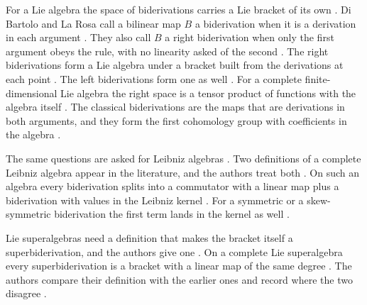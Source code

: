 For a Lie algebra the space of biderivations carries a Lie bracket of its own
\cite[p.~1]{DiBartoloLaRosa2026}. Di Bartolo and La Rosa call a bilinear map
$B$ a biderivation when it is a derivation in each argument
\cite[Definition~2.1, p.~2]{DiBartoloLaRosa2026}. They also call $B$ a right
biderivation when only the first argument obeys the rule, with no linearity
asked of the second \cite[Definition~3.1, p.~3]{DiBartoloLaRosa2026}. The
right biderivations form a Lie algebra under a bracket built from the
derivations at each point \cite[Theorem~3.5, p.~4]{DiBartoloLaRosa2026}. The
left biderivations form one as well \cite[Theorem~3.6,
p.~4]{DiBartoloLaRosa2026}. For a complete finite-dimensional Lie algebra the
right space is a tensor product of functions with the algebra itself
\cite[Corollary~3.8, p.~5]{DiBartoloLaRosa2026}. The classical biderivations
are the maps that are derivations in both arguments, and they form the first
cohomology group with coefficients in the algebra
\cite[p.~1]{DiBartoloLaRosa2026}.

The same questions are asked for Leibniz algebras
\cite[p.~1]{DiBartoloDiFattaLaRosa2025Leibniz}. Two definitions of a complete
Leibniz algebra appear in the literature, and the authors treat both
\cite[Definitions~2.6 and~2.7, p.~6]{DiBartoloDiFattaLaRosa2025Leibniz}. On
such an algebra every biderivation splits into a commutator with a linear map
plus a biderivation with values in the Leibniz kernel \cite[Theorem~3.1,
p.~7]{DiBartoloDiFattaLaRosa2025Leibniz}. For a symmetric or a skew-symmetric
biderivation the first term lands in the kernel as well \cite[Proposition~4.1,
p.~10]{DiBartoloDiFattaLaRosa2025Leibniz}.

Lie superalgebras need a definition that makes the bracket itself a
superbiderivation, and the authors give one \cite[Definition~2.6,
p.~5]{DiBartoloDiFattaLaRosa2025Super}. On a complete Lie superalgebra every
superbiderivation is a bracket with a linear map of the same degree
\cite[Theorem~3.6, p.~10]{DiBartoloDiFattaLaRosa2025Super}. The authors
compare their definition with the earlier ones and record where the two
disagree \cite[pp.~1--2]{DiBartoloDiFattaLaRosa2025Super}.

